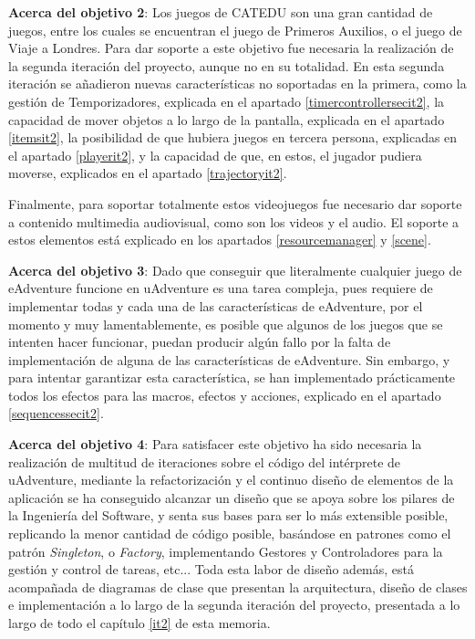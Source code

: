 \textbf{Acerca del objetivo 2}: Los juegos de CATEDU son una gran cantidad de juegos, entre los cuales se encuentran el juego de Primeros Auxilios, o el juego de Viaje a Londres. Para dar soporte a este objetivo fue necesaria la realización de la segunda iteración del proyecto, aunque no en su totalidad. En esta segunda iteración se añadieron nuevas características no soportadas en la primera, como la gestión de Temporizadores, explicada en el apartado \ref{timercontrollersecit2}, la capacidad de mover objetos a lo largo de la pantalla, explicada en el apartado \ref{itemsit2}, la posibilidad de que hubiera juegos en tercera persona, explicadas en el apartado \ref{playerit2}, y la capacidad de que, en estos, el jugador pudiera moverse, explicados en el apartado \ref{trajectoryit2}.

Finalmente, para soportar totalmente estos videojuegos fue necesario dar soporte a contenido multimedia audiovisual, como son los videos y el audio. El soporte a estos elementos está explicado en los apartados \ref{resourcemanager} y \ref{scene}.

\textbf{Acerca del objetivo 3}: Dado que conseguir que literalmente cualquier juego de eAdventure funcione en uAdventure es una tarea compleja, pues requiere de implementar todas y cada una de las características de eAdventure, por el momento y muy lamentablemente, es posible que algunos de los juegos que se intenten hacer funcionar, puedan producir algún fallo por la falta de implementación de alguna de las características de eAdventure. Sin embargo, y para intentar garantizar esta característica, se han implementado prácticamente todos los efectos para las macros, efectos y acciones, explicado en el apartado \ref{sequencessecit2}.

\textbf{Acerca del objetivo 4}: Para satisfacer este objetivo ha sido necesaria la realización de multitud de iteraciones sobre el código del intérprete de uAdventure, mediante la refactorización y el continuo diseño de elementos de la aplicación se ha conseguido alcanzar un diseño que se apoya sobre los pilares de la Ingeniería del Software, y senta sus bases para ser lo más extensible posible, replicando la menor cantidad de código posible, basándose en patrones como el patrón \textit{Singleton}, o \textit{Factory}, implementando Gestores y Controladores para la gestión y control de tareas, etc... Toda esta labor de diseño además, está acompañada de diagramas de clase que presentan la arquitectura, diseño de clases e implementación a lo largo de la segunda iteración del proyecto, presentada a lo largo de todo el capítulo \ref{it2} de esta memoria.

